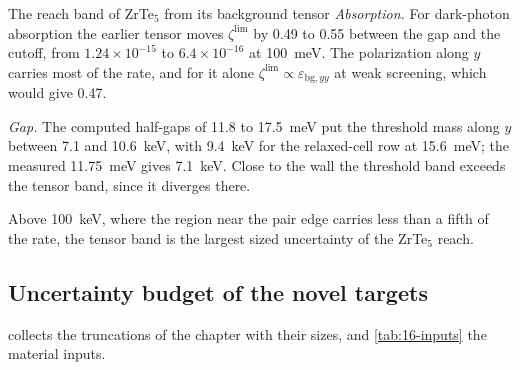 \begin{workedexample}{The reach band of ZrTe$_5$ from its background tensor}
\emph{Absorption.} For dark-photon absorption the earlier tensor moves $\zeta^{\mathrm{lim}}$ by 0.49 to 0.55 between the gap and the cutoff, from $1.24\times10^{-15}$ to $6.4\times10^{-16}$ at \SI{100}{meV}. The polarization along $y$ carries most of the rate, and for it alone $\zeta^{\mathrm{lim}} \propto \varepsilon_{\mathrm{bg},yy}$ at weak screening, which would give 0.47.

\emph{Gap.} The computed half-gaps of 11.8 to \SI{17.5}{meV} put the threshold mass along $y$ between 7.1 and \SI{10.6}{keV}, with \SI{9.4}{keV} for the relaxed-cell row at \SI{15.6}{meV}; the measured \SI{11.75}{meV} gives \SI{7.1}{keV}. Close to the wall the threshold band exceeds the tensor band, since it diverges there.
\end{workedexample}

Above \SI{100}{keV}, where the region near the pair edge carries less than a fifth of the rate, the tensor band is the largest sized uncertainty of the ZrTe$_5$ reach.

\subsection{Uncertainty budget of the novel targets}\label{sec:16.9-budget}

 collects the truncations of the chapter with their sizes, and \cref{tab:16-inputs} the material inputs.


